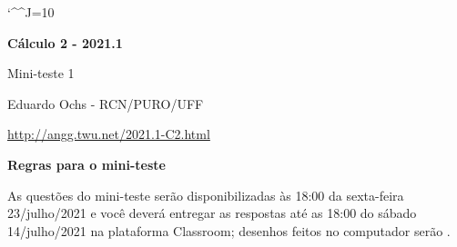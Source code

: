 \documentclass[oneside,12pt]{article}
\begin{document}
\catcode`\^^J=10

\pu


\def\mname#1{\text{[#1]}}

\def\drafturl{http://angg.twu.net/LATEX/2021-1-C2.pdf}
\def\drafturl{http://angg.twu.net/2021.1-C2.html}
\def\draftfooter{\tiny \href{\drafturl}{\jobname{}} \ColorBrown{\shorttoday{} \hours}}



%

\thispagestyle{empty}

\begin{center}

\vspace*{1.2cm}

{\bf \Large Cálculo 2 - 2021.1}

\bsk

Mini-teste 1

\bsk

Eduardo Ochs - RCN/PURO/UFF

\url{http://angg.twu.net/2021.1-C2.html}

\end{center}

\newpage


{\bf Regras para o mini-teste}

As questões do mini-teste serão disponibilizadas às 18:00 da
sexta-feira 23/julho/2021 e você deverá entregar as respostas
 até as 18:00 do sábado 14/julho/2021 na
plataforma Classroom; dese\-nhos feitos no computador serão
.
\end{document}
